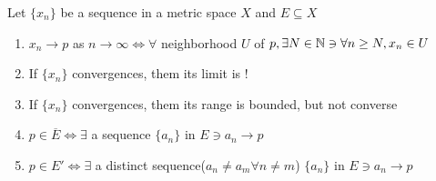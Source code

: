 \begin{thm}
	Let $\{x_n\}$ be a sequence in a metric space $X$ and $E \subseteq X$
	
	\begin{enumerate}[wide,label = $(\alph*)$]
		\item $x_n \rightarrow p$ as $n \rightarrow \infty \Leftrightarrow \forall $ neighborhood $U$ of $p, \exists N \in \mathbb{N} \ni \forall n \geq N,x_n \in U$
		\item If $\{x_n\}$ convergences, them its limit is !
		\item If $\{x_n\}$ convergences, them its range is bounded, but not converse
		\item $p \in \overline{E} \Leftrightarrow \exists$ a sequence $\{a_n\}$ in $E \ni a_n \rightarrow p$
		\item $p \in E' \Leftrightarrow \exists$ a distinct sequence($a_n \neq a_m \forall n \neq m$) $\{a_n\}$ in $E \ni a_n \rightarrow p$
	\end{enumerate}
\end{thm}


